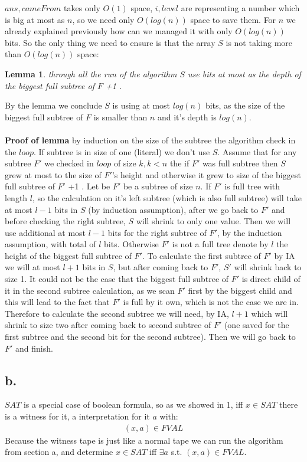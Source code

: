 \documentclass[11pt]{article}
\theoremstyle{plain}
\newtheorem{lemma}[theorem]{Lemma}
\theoremstyle{nonumberplainnobrackets}
\begin{document}
\newpage
$ans,cameFrom$ takes only $O(1)$ space, $i,level$ are representing a number which is big at most as $n$, so we need only $O(log(n))$ space to save them. For $n$ we already explained previously how can we managed it with only $O(log(n))$ bits. So the only thing we need to ensure is that the array $S$ is not taking more than $O(log(n))$ space:
\begin{lemma} through all the run of the algorithm $S$ use bits at most as the depth of the biggest full subtree of $F$ +1 .
\end{lemma}
By the lemma we conclude $S$ is using at most $log(n)$ bits, as the size of the biggest full subtree of $F$ is smaller than $n$ and it's depth is $log(n)$.
\\
\\ \textbf{Proof of lemma} by induction on the size of the subtree the algorithm check in the $loop$. If subtree is in size of one (literal) we don't use $S$. Assume that for any subtree $F'$ we checked in $loop$ of size $k,k <n$ the if $F'$ was full subtree then $S$ grew at most to the size of $F'$'s height and otherwise it grew to size of the biggest full subtree of $F'$ +1 . Let be $F'$ be a subtree of size $n$. If $F'$ is full tree with length $l$, so the calculation on it's left subtree (which is also full subtree) will take at most $l-1$ bits in $S$ (by induction assumption), after we go back to $F'$ and before checking the right subtree, $S$ will shrink to only one value. Then we will use additional at most $l-1$ bits for the right subtree of $F'$, by the induction assumption, with total of $l$ bits. Otherwise $F'$ is not a full tree denote by $l$ the height of the biggest full subtree of $F'$.
To calculate the first subtree of $F'$ by IA we will at most $l+1$ bits in $S$, but after coming back to $F'$, $S'$ will shrink back to size 1. It could not be the case that the biggest full subtree of $F'$ is direct child of it in the second subtree calculation, as we scan $F'$ first by the biggest child and this will lead to the fact that $F'$ is full by it own, which is not the case we are in. Therefore to calculate the second subtree we will need, by IA, $l+1$ which will shrink to size two after coming back to second subtree of $F'$ (one saved for the first subtree and the second bit for the second subtree). Then we will go back to $F'$ and finish.
\subsection*{b. } $SAT$ is a special case of boolean formula, so as we showed in 1, iff $x\in SAT$ there is a witness for it, a interpretation for it $a$ with:  
\begin{align*}
(x,a)\in FVAL
\end{align*}
Because the witness tape is just like a normal tape we can run the algorithm from section a, and determine $x\in SAT$ iff $\exists a$ s.t. $ (x,a)\in FVAL$. 
\end{document}
